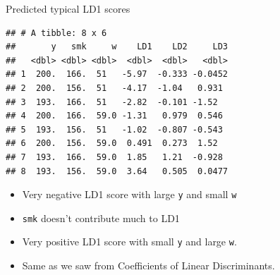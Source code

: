 \documentclass[
  ignorenonframetext,
]{beamer}
\newenvironment{Shaded}{\begin{snugshade}}{\end{snugshade}}
\newcommand{\KeywordTok}[1]{\textcolor[rgb]{0.13,0.29,0.53}{\textbf{#1}}}
\newcommand{\NormalTok}[1]{#1}
\newcommand{\OperatorTok}[1]{\textcolor[rgb]{0.81,0.36,0.00}{\textbf{#1}}}
\newcommand{\StringTok}[1]{\textcolor[rgb]{0.31,0.60,0.02}{#1}}
\begin{document}
\begin{frame}[fragile]{Predicted typical LD1 scores}
\protect\hypertarget{predicted-typical-ld1-scores}{}

\footnotesize

\begin{Shaded}
\end{Shaded}

\begin{verbatim}
## # A tibble: 8 x 6
##       y   smk     w    LD1    LD2     LD3
##   <dbl> <dbl> <dbl>  <dbl>  <dbl>   <dbl>
## 1  200.  166.  51   -5.97  -0.333 -0.0452
## 2  200.  156.  51   -4.17  -1.04   0.931 
## 3  193.  166.  51   -2.82  -0.101 -1.52  
## 4  200.  166.  59.0 -1.31   0.979  0.546 
## 5  193.  156.  51   -1.02  -0.807 -0.543 
## 6  200.  156.  59.0  0.491  0.273  1.52  
## 7  193.  166.  59.0  1.85   1.21  -0.928 
## 8  193.  156.  59.0  3.64   0.505  0.0477
\end{verbatim}

\normalsize

\begin{itemize}
\item
  Very negative LD1 score with large \texttt{y} and small \texttt{w}
\item
  \texttt{smk} doesn't contribute much to LD1
\item
  Very positive LD1 score with small \texttt{y} and large \texttt{w}.
\item
  Same as we saw from Coefficients of Linear Discriminants.
\end{itemize}

\end{frame}
\end{document}
